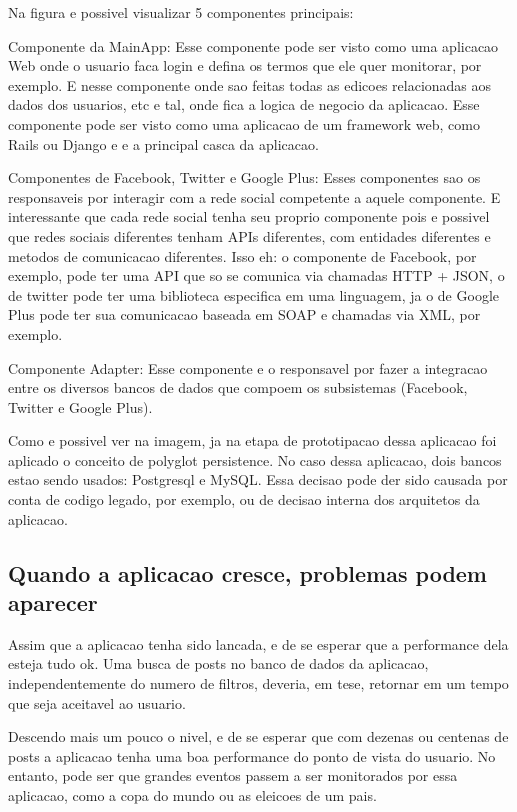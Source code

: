 Na figura e possivel visualizar 5 componentes principais: 

Componente da MainApp: Esse componente pode ser visto como uma aplicacao Web onde o usuario faca login e defina os termos que ele quer monitorar, por exemplo. E nesse componente onde sao feitas todas as edicoes relacionadas aos dados dos usuarios, etc e tal, onde fica a logica de negocio da aplicacao. Esse componente pode ser visto como uma aplicacao de um framework web, como Rails ou Django e e a principal casca da aplicacao. 

Componentes de Facebook, Twitter e Google Plus: Esses componentes sao os responsaveis por interagir com a rede social competente a aquele componente. E interessante que cada rede social tenha seu proprio componente pois e possivel que redes sociais diferentes tenham APIs diferentes, com entidades diferentes e metodos de comunicacao diferentes. Isso eh: o componente de Facebook, por exemplo, pode ter uma API que so se comunica via chamadas HTTP + JSON, o de twitter pode ter uma biblioteca especifica em uma linguagem, ja o de Google Plus pode ter sua comunicacao baseada em SOAP e chamadas via XML, por exemplo. 

Componente Adapter: Esse componente e o responsavel por fazer a integracao entre os diversos bancos de dados que compoem os subsistemas (Facebook, Twitter e Google Plus). 

Como e possivel ver na imagem, ja na etapa de prototipacao dessa aplicacao foi aplicado o conceito de polyglot persistence. No caso dessa aplicacao, dois bancos estao sendo usados: Postgresql e MySQL. Essa decisao pode der sido causada por conta de codigo legado, por exemplo, ou de decisao interna dos arquitetos da aplicacao.



\subsection{Quando a aplicacao cresce, problemas podem aparecer}
\label{shithappens}
Assim que a aplicacao tenha sido lancada, e de se esperar que a performance dela esteja tudo ok. Uma busca de posts no banco de dados da aplicacao, independentemente do numero de filtros, deveria, em tese, retornar em um tempo que seja aceitavel ao usuario. 

Descendo mais um pouco o nivel, e de se esperar que com dezenas ou centenas de posts a aplicacao tenha uma boa performance do ponto de vista do usuario. 
No entanto, pode ser que grandes eventos passem a ser monitorados por essa aplicacao, como a copa do mundo ou as eleicoes de um pais. 

